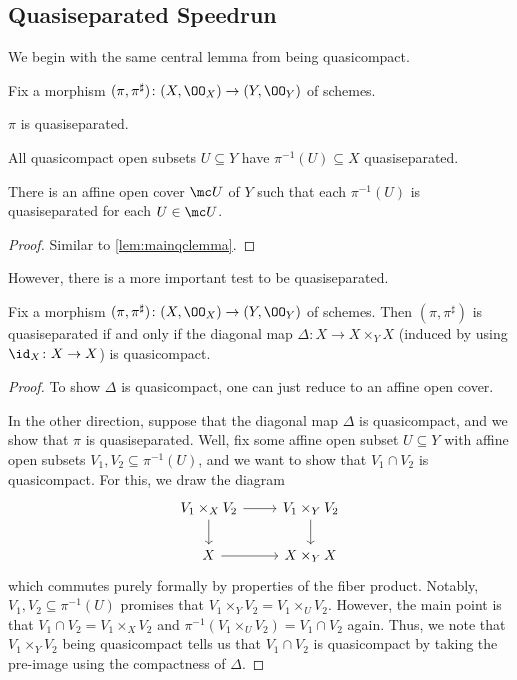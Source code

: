 \documentclass[../notes.tex]{subfiles}
\begin{document}
\subsection{Quasiseparated Speedrun}
We begin with the same central lemma from being quasicompact.
\begin{lemma} \label{lem:mainqslemma}
	Fix a morphism $(\pi,\pi^\sharp)\colon(X,\OO_X)\to(Y,\OO_Y)$ of schemes.
	\begin{listalph}
		\item $\pi$ is quasiseparated.
		\item All quasicompact open subsets $U\subseteq Y$ have $\pi^{-1}(U)\subseteq X$ quasiseparated.
		\item There is an affine open cover $\mc U$ of $Y$ such that each $\pi^{-1}(U)$ is quasiseparated for each $U\in\mc U$.
	\end{listalph}
\end{lemma}
\begin{proof}
	Similar to \autoref{lem:mainqclemma}.
\end{proof}
However, there is a more important test to be quasiseparated.
\begin{lemma} \label{lem:qs-by-diag}
	Fix a morphism $(\pi,\pi^\sharp)\colon(X,\OO_X)\to(Y,\OO_Y)$ of schemes. Then $(\pi,\pi^\sharp)$ is quasiseparated if and only if the diagonal map $\Delta\colon X\to X\times_YX$ (induced by using $\id_X\colon X\to X$) is quasicompact.
\end{lemma}
\begin{proof}
	To show $\Delta$ is quasicompact, one can just reduce to an affine open cover.
	
	In the other direction, suppose that the diagonal map $\Delta$ is quasicompact, and we show that $\pi$ is quasiseparated. Well, fix some affine open subset $U\subseteq Y$ with affine open subsets $V_1,V_2\subseteq\pi^{-1}(U)$, and we want to show that $V_1\cap V_2$ is quasicompact. For this, we draw the diagram
	\[\begin{tikzcd}
		{V_1\times_XV_2} & {V_1\times_YV_2} \\
		X & {X\times_YX}
		\arrow[from=2-1, to=2-2]
		\arrow[from=1-2, to=2-2]
		\arrow[from=1-1, to=1-2]
		\arrow[from=1-1, to=2-1]
	\end{tikzcd}\]
	which commutes purely formally by properties of the fiber product. Notably, $V_1,V_2\subseteq\pi^{-1}(U)$ promises that $V_1\times_YV_2=V_1\times_UV_2$. However, the main point is that $V_1\cap V_2=V_1\times_XV_2$ and $\pi^{-1}(V_1\times_UV_2)=V_1\cap V_2$ again. Thus, we note that $V_1\times_YV_2$ being quasicompact tells us that $V_1\cap V_2$ is quasicompact by taking the pre-image using the compactness of $\Delta$.
\end{proof}
\end{document}
